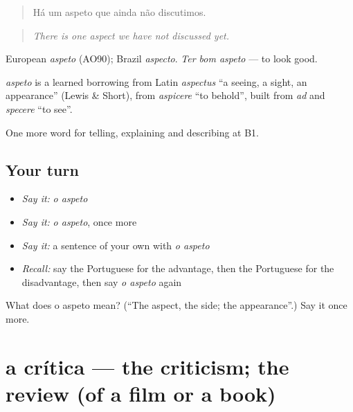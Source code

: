 \begin{quote}
Há um aspeto que ainda não discutimos.
\end{quote}

\begin{quote}
\emph{There is one aspect we have not discussed yet.}
\end{quote}

European \emph{aspeto} (AO90); Brazil \emph{aspecto}. \emph{Ter bom aspeto} — to look good.

\begin{cousinweb}
\emph{aspeto} is a learned borrowing from Latin \emph{aspectus} \textquotedblleft{}a seeing, a sight, an appearance\textquotedblright{} (Lewis \& Short), from \emph{aspicere} \textquotedblleft{}to behold\textquotedblright{}, built from \emph{ad} and \emph{specere} \textquotedblleft{}to see\textquotedblright{}.
\end{cousinweb}

\begin{grammarlens}[title={What you've built}]
One more word for telling, explaining and describing at B1.
\end{grammarlens}

\subsection*{Your turn}
\begin{itemize}
\raggedright
  \item \emph{Say it:} \emph{o aspeto}
  \item \emph{Say it:} \emph{o aspeto}, once more
  \item \emph{Say it:} a sentence of your own with \emph{o aspeto}
  \item \emph{Recall:} say the Portuguese for the advantage, then the Portuguese for the disadvantage, then say \emph{o aspeto} again
\end{itemize}

\begin{tcolorbox}[breakable,colback=teal!4,colframe=teal!35!black,title={Before you move on}]
What does o aspeto mean? (\textquotedblleft{}The aspect, the side; the appearance\textquotedblright{}.) Say it once more.
\end{tcolorbox}
\section[a crítica]{a crítica — the criticism; the review (of a film or a book)}

